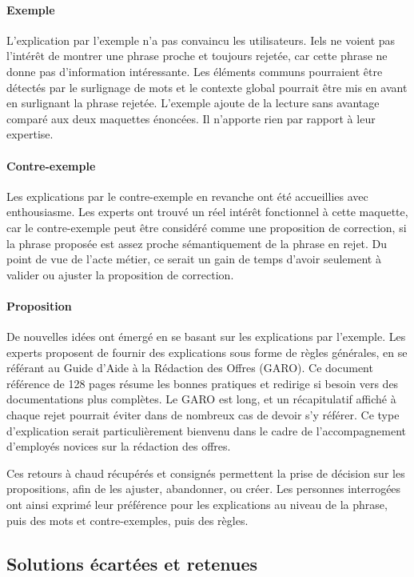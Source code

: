 \paragraph{Exemple} L'explication par l'exemple n'a pas convaincu les utilisateurs. Iels ne voient pas l'intérêt de montrer une phrase proche et toujours rejetée, car cette phrase ne donne pas d'information intéressante. Les éléments communs pourraient être détectés par le surlignage de mots et le contexte global pourrait être mis en avant en surlignant la phrase rejetée. L'exemple ajoute de la lecture sans avantage comparé aux deux maquettes énoncées. Il n'apporte rien par rapport à leur expertise.

\paragraph{Contre-exemple} Les explications par le contre-exemple en revanche ont été accueillies avec enthousiasme. Les experts ont trouvé un réel intérêt fonctionnel à cette maquette, car le contre-exemple peut être considéré comme une proposition de correction, si la phrase proposée est assez proche sémantiquement de la phrase en rejet. Du point de vue de l'acte métier, ce serait un gain de temps d'avoir seulement à valider ou ajuster la proposition de correction.

\paragraph{Proposition} De nouvelles idées ont émergé en se basant sur les explications par l'exemple. Les experts proposent de fournir des explications sous forme de règles générales, en se référant au Guide d'Aide à la Rédaction des Offres (GARO). Ce document référence de 128 pages résume les bonnes pratiques et redirige si besoin vers des documentations plus complètes. Le GARO est long, et un récapitulatif affiché à chaque rejet pourrait éviter dans de nombreux cas de devoir s'y référer.
Ce type d'explication serait particulièrement bienvenu dans le cadre de l'accompagnement d'employés novices sur la rédaction des offres.

Ces retours à chaud récupérés et consignés permettent la prise de décision sur les propositions, afin de les ajuster, abandonner, ou créer. Les personnes interrogées ont ainsi exprimé leur préférence pour les explications au niveau de la phrase, puis des mots et contre-exemples, puis des règles.

\subsection{Solutions écartées et retenues}\label{C3:solution}

